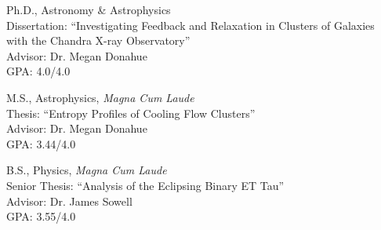 \documentclass[12pt]{cv}
\begin{document}
\begin{llist}


Ph.D., Astronomy \& Astrophysics\\
Dissertation: ``Investigating Feedback and Relaxation in Clusters of Galaxies\\ with the Chandra X-ray Observatory''\\
Advisor: Dr. Megan Donahue\\
GPA: 4.0/4.0

M.S., Astrophysics, {\it Magna Cum Laude}\\
Thesis: ``Entropy Profiles of Cooling Flow Clusters''\\
Advisor: Dr. Megan Donahue\\
GPA: 3.44/4.0

B.S., Physics, {\it Magna Cum Laude}\\
Senior Thesis: ``Analysis of the Eclipsing Binary ET Tau''\\
Advisor: Dr. James Sowell\\
GPA: 3.55/4.0







\end{llist}
\end{document}
